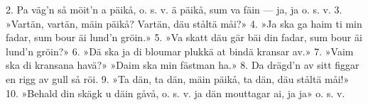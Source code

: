 2.  Pa väg’n så möit’n a päikå, o. s. v.
    ä päikå, sum va fäin — ja, ja o. s. v.
3.  »Vartän, vartän, mäin päikå?
    Vartän, däu ståltä måi?»
4.  »Ja ska ga haim ti min fadar,
    sum bour äi lund’n gröin.»
5.  »Va skatt däu gär bäi din fadar,
    sum bour äi lund’n gröin?»
6.  »Dä ska ja di bloumar plukkä
    at bindä kransar av.»
7.  »Vaim ska di kransana havä?»
    »Daim ska min fästman ha.»
8.  Da drägd’n av sitt figgar
    en rigg av gull så röi.
9.  »Ta dän, ta dän, mäin päikå,
    ta dän, däu ståltä måi!»
10. »Behald din skägk u däin gåvå, o. s. v.
    ja dän mouttagar ai, ja ja» o. s. v.
